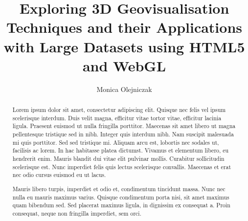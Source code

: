 \documentclass[
	fontsize=11pt
	headlines=2,
	footlines=2,
	parskip=half
]{scrartcl}
\title{Exploring 3D Geovisualisation Techniques and their Applications with Large Datasets using HTML5 and WebGL}
\author{Monica Olejniczak}
\begin{document}
	\makeatletter
		\textbf{\LARGE\textsf{\@title}}
		\vspace{-2.5em}
		\begin{center}
			\large\textbf{\textsf{\@author}}
		\end{center}
		\vspace{-2.5em}
	\makeatother

	\begin{abstract}
		Lorem ipsum dolor sit amet, consectetur adipiscing elit. Quisque nec felis vel ipsum scelerisque interdum. Duis velit magna, efficitur vitae tortor vitae, efficitur lacinia ligula. Praesent euismod ut nulla fringilla porttitor. Maecenas sit amet libero ut magna pellentesque tristique sed in nibh. Integer quis interdum nibh. Nam suscipit malesuada mi quis porttitor. Sed sed tristique mi. Aliquam arcu est, lobortis nec sodales ut, facilisis ac lorem. In hac habitasse platea dictumst. Vivamus et elementum libero, eu hendrerit enim. Mauris blandit dui vitae elit pulvinar mollis. Curabitur sollicitudin scelerisque est. Nunc imperdiet felis quis lectus scelerisque convallis. Maecenas et erat nec odio cursus euismod eu ut lacus.

		Mauris libero turpis, imperdiet et odio et, condimentum tincidunt massa. Nunc nec nulla eu mauris maximus varius. Quisque condimentum porta nisi, sit amet maximus quam bibendum sed. Sed placerat maximus ligula, in dignissim ex consequat a. Proin consequat, neque non fringilla imperdiet, sem orci.
	\end{abstract}
	
\end{document}
